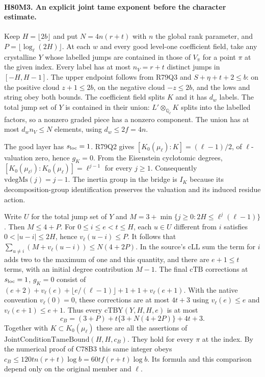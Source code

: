 \paragraph{H80M3. An explicit joint tame exponent before the character estimate.}
Keep $H=\lfloor2b\rfloor$ and put
$N=4n(r+t)$ with $n$ the global rank parameter, and
$P=\lfloor\log_\ell(2H)\rfloor$. At each $w$ and every good
level-one coefficient field, take any crystalline $Y$ whose
labelled jumps are contained in those of $V_\pi$ for a point
$\pi$ at the given index. Every label has at most $n_V=r+t$
distinct jumps in $[-H,H-1]$. The upper endpoint follows from
R79Q3 and $S+\eta+t+2\le b$: on the positive cloud $z+1\le2b$,
on the negative cloud $-z\le2b$, and the lows and string obey
both bounds. The coefficient field splits $K$ and it has $d_w$
labels. The total jump set of $Y$ is contained in their union:
$L'\otimes_{\mathbb Q_\ell}K$ splits into the labelled factors,
so a nonzero graded piece has a nonzero component. The union
has at most $d_wn_V\le N$ elements, using $d_w\le2f=4n$.

The good layer has $s_{\rm loc}=1$. R79Q2 gives
$[K_0(\mu_\ell):K]=(\ell-1)/2$, of $\ell$-valuation zero, hence
$g_K=0$. From the Eisenstein cyclotomic degrees,
$[K_0(\mu_{\ell^j}):K_0(\mu_\ell)]=\ell^{j-1}$ for every $j\ge1$.
Consequently $\mathrm{vdegMs}(j)=j-1$. The inertia group in the
bridge is $I_K$ because its decomposition-group identification
preserves the valuation and its induced residue action.

Write $U$ for the total jump set of $Y$ and
$M=3+\min\{j\ge0:2H\le\ell^j(\ell-1)\}$. Then $M\le4+P$.
For $0\le i\le e<t\le H$, each $u\in U$ different from $i$
satisfies $0<|u-i|\le2H$, hence $v_\ell(u-i)\le P$. It follows that
$\sum_{u\ne i}(M+v_\ell(u-i))\le N(4+2P)$. In the source's
$\mathrm{cLL}$ sum the term for $i$ adds two to the maximum of one
and this quantity, and there are $e+1\le t$ terms, with an initial
degree contribution $M-1$. The final $\mathrm{cTB}$ corrections
at $s_{\rm loc}=1$, $g_K=0$ consist of
$(e+2)+v_\ell(e)+\lfloor e/(\ell-1)\rfloor+1+1+v_\ell(e+1)$.
With the native convention $v_\ell(0)=0$, these corrections
are at most $4t+3$ using $v_\ell(e)\le e$ and
$v_\ell(e+1)\le e+1$. Thus every $\mathrm{cTBY}(Y,H,H,e)$ is at most
\[
               c_B=(3+P)+t\{3+N(4+2P)\}+4t+3 .
\]
Together with $K\subset K_0(\mu_\ell)$ these are all the assertions
of $\mathrm{JointConditionTameBound}(H,H,c_B)$. They hold for every
$\pi$ at the index. By the numerical proof of C78B3 this same
integer obeys $c_B\le120tn(r+t)\log b=60tf(r+t)\log b$.
Its formula and this comparison depend only on the original member
and $\ell$.

